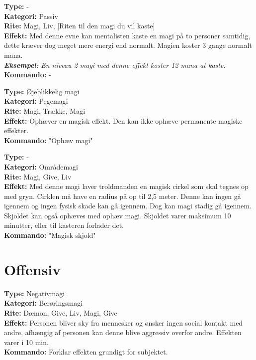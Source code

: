 \begin{primærMagi*}
\textbf{Type:} - \\
\textbf{Kategori:} Passiv\\
\textbf{Rite:} Magi, Liv, [Riten til den magi du vil kaste]\\
\textbf{Effekt:} Med denne evne kan mentalisten kaste en magi på to personer samtidig, dette kræver dog meget mere energi end normalt. Magien koster 3 gange normalt mana. \\
\textit{\textbf{Eksempel:}} \textit{En niveau 2 magi med denne effekt koster 12 mana at kaste.}\\
\textbf{Kommando:} -
\end{primærMagi*}

\begin{primærMagi*}
\textbf{Type:} Øjeblikkelig magi\\
\textbf{Kategori:} Pegemagi\\
\textbf{Rite:} Magi, Trække, Magi\\
\textbf{Effekt:} Ophæver en magisk effekt. Den kan ikke ophæve permanente magiske effekter.\\
\textbf{Kommando:} "Ophæv magi"
\end{primærMagi*}

\begin{primærMagi*}
\textbf{Type:} -\\
\textbf{Kategori:} Områdemagi \\
\textbf{Rite:} Magi, Give, Liv \\
\textbf{Effekt:} Med denne magi laver troldmanden en magisk cirkel som skal tegnes op med gryn. Cirklen må have
en radius på op til 2,5 meter. Denne kan ingen gå igennem og ingen fysisk skade kan gå igennem. Dog kan magi stadig gå igennem. Skjoldet kan også ophæves med ophæv magi. Skjoldet varer maksimum 10 minutter, eller til kasteren forlader det. \\
\textbf{Kommando:} "Magisk skjold"
\end{primærMagi*}

\section{Offensiv}

\begin{offensiv*}[Aggressiv]
\textbf{Type:} Negativmagi\\
\textbf{Kategori:} Berøringsmagi\\
\textbf{Rite:} Dæmon, Give, Liv, Magi, Give\\ 
\textbf{Effekt:} Personen bliver sky fra mennesker og ønsker ingen social kontakt med andre, afhængig af personen kan denne blive aggressiv overfor andre. Effekten varer i 10 min.\\
\textbf{Kommando:} Forklar effekten grundigt for subjektet.
\end{offensiv*}

